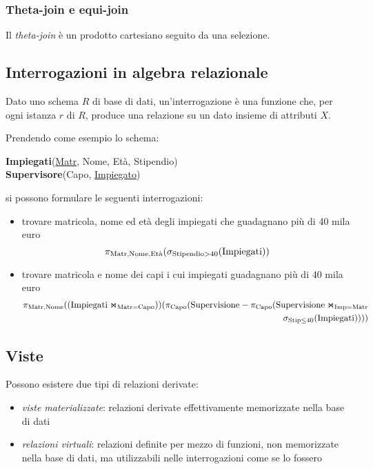\documentclass[11pt]{book}
\begin{document}
\subsubsection{Theta-join e equi-join}
Il \textit{theta-join} è un prodotto cartesiano seguito da una selezione.
\subsection{Interrogazioni in algebra relazionale}
Dato uno schema $R$ di base di dati, un'interrogazione è una funzione che, per ogni istanza $r$ di $R$, produce una relazione 
su un dato insieme di attributi $X$.

Prendendo come esempio lo schema:
\begin{center}
    \textbf{Impiegati}(\underline{Matr}, Nome, Età, Stipendio)\\
    \textbf{Supervisore}(Capo, \underline{Impiegato})
\end{center}
si possono formulare le seguenti interrogazioni:
\begin{itemize}
    \item trovare matricola, nome ed età degli impiegati che guadagnano più di 40 mila euro
    \begin{equation*}
        \pi_{\textnormal{Matr,Nome,Età}}(\sigma_{\textnormal{Stipendio$>$40}}(\textnormal{Impiegati}))
    \end{equation*}
    \item trovare matricola e nome dei capi i cui impiegati guadagnano più di 40 mila euro 
    \begin{align*}
        \pi_{\textnormal{Matr,Nome}}((\textnormal{Impiegati}\Join_{\textnormal{Matr=Capo}}))(\pi_{\textnormal{Capo}}
        (\textnormal{Supervisione}-\pi_{\textnormal{Capo}}(\textnormal{Supervisione}\Join_{\textnormal{Imp=Matr}}
        \\\sigma_{\textnormal{Stip$\leq$40}}(\textnormal{Impiegati}))))
    \end{align*}
\end{itemize}
\subsection{Viste}
Possono esistere due tipi di relazioni derivate: 
\begin{itemize}
    \item \textit{viste materializzate}: relazioni derivate effettivamente memorizzate nella base di dati 
    \item \textit{relazioni virtuali}: relazioni definite per mezzo di funzioni, non memorizzate nella base di dati, ma 
    utilizzabili nelle interrogazioni come se lo fossero
\end{itemize}
\end{document}
